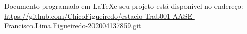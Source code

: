 
%
\begin{anexosenv}

\partanexos

Documento programado em \LaTeX  e seu projeto está disponível no endereço: \\ \href{https://github.com/ChicoFigueiredo/estacio-Trab001-AASE-Francisco.Lima.Figueiredo-202004137859.git}{ https://github.com/ChicoFigueiredo/estacio-Trab001-AASE-Francisco.Lima.Figueiredo-202004137859.git }\\


\end{anexosenv}
